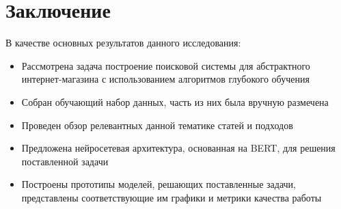 \documentclass[12pt,a4paper]{article}
\begin{document}
\begin{table}[H]
\begin{center}
\caption{Предложение следующего слова при вводе пользователем запроса.}
\end{center}
\end{table}

\section{Заключение}
В качестве основных результатов данного исследования:
\begin{itemize}
    \item Рассмотрена задача построение поисковой системы для абстрактного интернет-магазина с использованием алгоритмов глубокого обучения
    \item Собран обучающий набор данных, часть из них была вручную размечена
    \item Проведен обзор релевантных данной тематике статей и подходов
    \item Предложена нейросетевая архитектура, основанная на BERT, для решения поставленной задачи
    \item Построены прототипы моделей, решающих поставленные задачи, представлены соответствующие им графики и метрики качества работы
\end{itemize}
\end{document}
